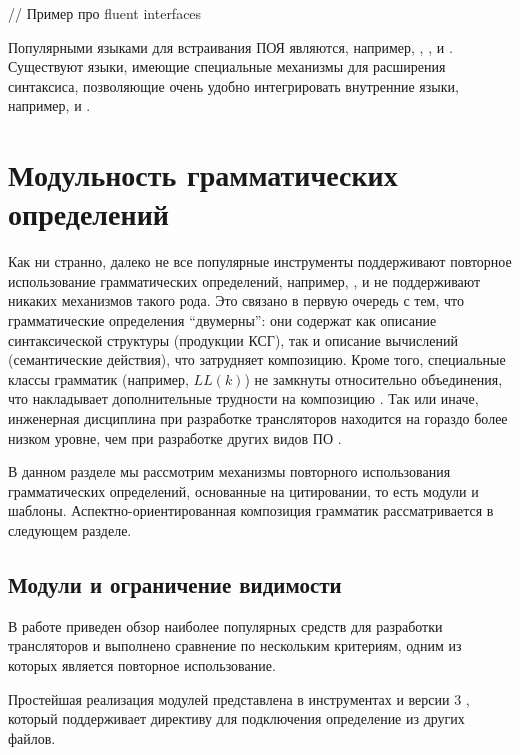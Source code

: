 // Пример про fluent interfaces

Популярными языками для встраивания ПОЯ являются, например,  \cite{Groovy},  \cite{Haskell98},  \cite{Odersky2008} и  \cite{JLS}. Существуют языки, имеющие специальные механизмы для расширения синтаксиса, позволяющие очень удобно интегрировать внутренние языки, например,  \cite{Nemerle} и  \cite{PLOT}.
		
\section{Модульность грамматических определений}

Как ни странно, далеко не все популярные инструменты поддерживают повторное использование грамматических определений, например,  \cite{BisonBook},  \cite{CocoR} и  \cite{JavaCC} не поддерживают никаких механизмов такого рода. Это связано в первую очередь с тем, что грамматические определения ``двумерны'': они содержат как описание синтаксической структуры (продукции КСГ), так и описание вычислений (семантические действия), что затрудняет композицию. Кроме того, специальные классы грамматик (например, $LL(k)$) не замкнуты относительно объединения, что накладывает дополнительные трудности на композицию \cite{???}. Так или иначе, инженерная дисциплина при разработке трансляторов находится на гораздо более низком уровне, чем при разработке других видов ПО \cite{Grammarware}.

В данном разделе мы рассмотрим механизмы повторного использования грамматических определений, основанные на цитировании, то есть модули и шаблоны. Аспектно-ориентированная композиция грамматик рассматривается в следующем разделе.

\subsection{Модули и ограничение видимости} В работе \cite{SysProg-2006} приведен обзор наиболее популярных средств для разработки трансляторов и выполнено сравнение по нескольким критериям, одним из которых является повторное использование.

Простейшая реализация модулей представлена в инструментах  \cite{Elkhound} и  версии 3 \cite{ANTLR}, который поддерживает директиву  для подключения определение из других файлов. 

